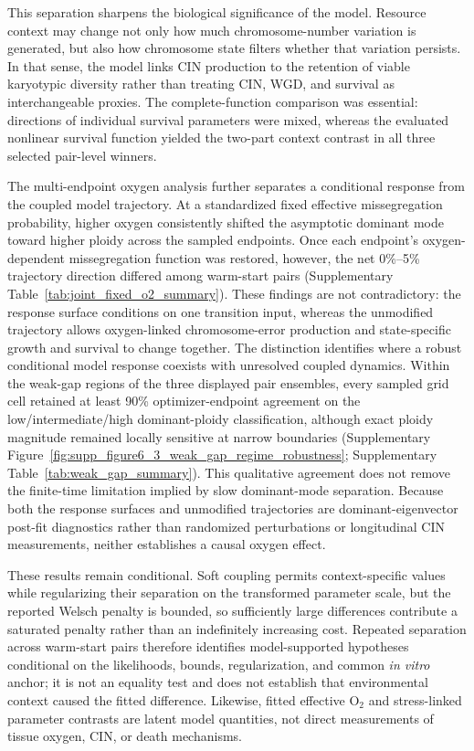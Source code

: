 \documentclass[11pt]{article}
\begin{document}
This separation sharpens the biological significance of the model. Resource context may change not only how much chromosome-number variation is generated, but also how chromosome state filters whether that variation persists. In that sense, the model links CIN production to the retention of viable karyotypic diversity rather than treating CIN, WGD, and survival as interchangeable proxies. The complete-function comparison was essential: directions of individual survival parameters were mixed, whereas the evaluated nonlinear survival function yielded the two-part context contrast in all three selected pair-level winners.

The multi-endpoint oxygen analysis further separates a conditional response from the coupled model trajectory. At a standardized fixed effective missegregation probability, higher oxygen consistently shifted the asymptotic dominant mode toward higher ploidy across the sampled endpoints. Once each endpoint's oxygen-dependent missegregation function was restored, however, the net 0\%--5\% trajectory direction differed among warm-start pairs (Supplementary Table~\ref{tab:joint_fixed_o2_summary}). These findings are not contradictory: the response surface conditions on one transition input, whereas the unmodified trajectory allows oxygen-linked chromosome-error production and state-specific growth and survival to change together. The distinction identifies where a robust conditional model response coexists with unresolved coupled dynamics. Within the weak-gap regions of the three displayed pair ensembles, every sampled grid cell retained at least 90\% optimizer-endpoint agreement on the low/intermediate/high dominant-ploidy classification, although exact ploidy magnitude remained locally sensitive at narrow boundaries (Supplementary Figure~\ref{fig:supp_figure6_3_weak_gap_regime_robustness}; Supplementary Table~\ref{tab:weak_gap_summary}). This qualitative agreement does not remove the finite-time limitation implied by slow dominant-mode separation. Because both the response surfaces and unmodified trajectories are dominant-eigenvector post-fit diagnostics rather than randomized perturbations or longitudinal CIN measurements, neither establishes a causal oxygen effect.

These results remain conditional. Soft coupling permits context-specific values while regularizing their separation on the transformed parameter scale, but the reported Welsch penalty is bounded, so sufficiently large differences contribute a saturated penalty rather than an indefinitely increasing cost. Repeated separation across warm-start pairs therefore identifies model-supported hypotheses conditional on the likelihoods, bounds, regularization, and common \textit{in vitro} anchor; it is not an equality test and does not establish that environmental context caused the fitted difference. Likewise, fitted effective O$_2$ and stress-linked parameter contrasts are latent model quantities, not direct measurements of tissue oxygen, CIN, or death mechanisms.
\end{document}
